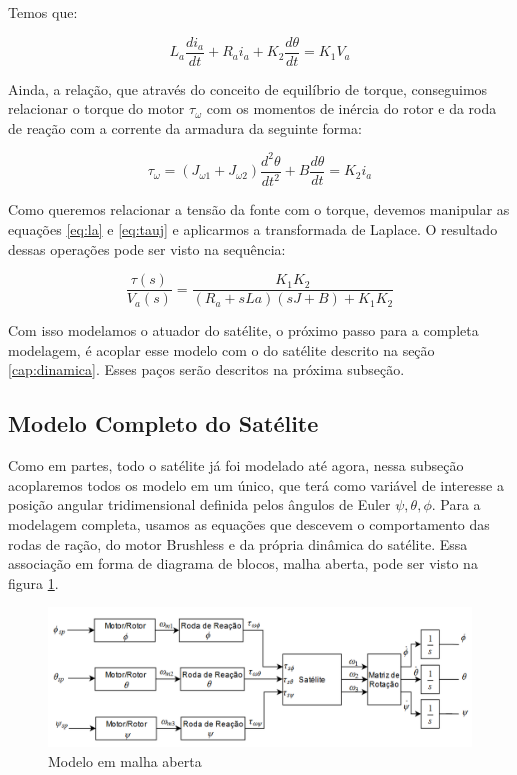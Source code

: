 Temos que:

\begin{equation}\label{eq:la}
L_a \frac{di_a}{dt}+R_a i_a + K_2\frac{d\theta}{dt} = K_1V_a
\end{equation}

Ainda, a relação, que através do conceito de equilíbrio de torque, conseguimos relacionar o torque do motor $\tau_{\omega}$ com os momentos de inércia do rotor e da roda de reação com a corrente da armadura da seguinte forma:

\begin{equation}\label{eq:tauj}
\tau_{\omega} = (J_{\omega 1} + J_{\omega 2})\frac{d^{2}\theta}{dt^{2}}+B\frac{d\theta}{dt} = K_2 i_a
\end{equation}

Como queremos relacionar a tensão da fonte com o torque, devemos manipular as equações \ref{eq:la} e \ref{eq:tauj} e aplicarmos a transformada de Laplace. O resultado dessas operações pode ser visto na sequência: 

\begin{equation}
  \frac{\tau(s)}{V_a(s)} = \frac{K_1K_2}{(R_a+ sLa)(sJ+B)+K_1K_2}  
\end{equation}

Com isso modelamos o atuador do satélite, o próximo passo para a completa modelagem, é acoplar esse modelo com o do satélite descrito na seção \ref{cap:dinamica}. Esses paços serão descritos na próxima subseção.

\subsection{Modelo Completo do Satélite}

Como em partes, todo o satélite já foi modelado até agora, nessa subseção acoplaremos todos os modelo em um único, que terá como variável de interesse a posição angular tridimensional definida pelos ângulos de Euler $\psi, \theta, \phi$. Para a modelagem completa, usamos as equações que descevem o comportamento das rodas de ração, do motor Brushless e da própria dinâmica do satélite. Essa associação em forma de diagrama de blocos, malha aberta, pode ser visto na figura \ref{fig:modelo_satelite_malha_aberta}.

\begin{figure}[H]
  \caption{Modelo em malha aberta}
  \begin{center}
      \includegraphics[scale=.55]{img/modelo_satelite_malha_aberta}
  \end{center}
  \label{fig:modelo_satelite_malha_aberta}
\end{figure}

